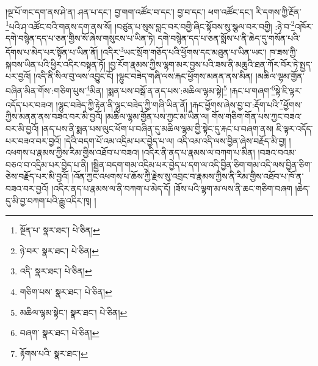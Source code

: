 །ལྔ་པོ་གང་དག་ནས་ཤེ་ན། ཤན་པ་དང་། བྱ་གག་འཚོང་བ་དང་། བྱ་བ་དང་། ཕག་འཚོང་དང་། རི་དགས་ཀྱི་རྔོན་\footnote{སྔོན་པ་  སྣར་ཐང་།  པེ་ཅིན། }པའི་ཤ་འཚོང་བའི་གནས་དག་ནས་སོ། །བཙུན་པ་སུས་བླང་བར་བགྱི་ཞིང་སྟོབས་སུ་སྩལ་བར་བགྱི། :ཉེ་བ་\footnote{ཉེ་བར་  སྣར་ཐང་།  པེ་ཅིན། }འཁོར་དགེ་བསྙེན་དད་པ་ཅན་གྱིས་སོ་ཞེས་གསུངས་པ་ཡིན་ཏེ། དགེ་བསྙེན་དད་པ་ཅན་སྨོས་པ་ནི་ཆེད་དུ་གསོན་པའི་དོགས་པ་མེད་པར་སྟོན་པ་ཡིན་ནོ། །འདིར་\footnote{འདི་  སྣར་ཐང་།  པེ་ཅིན། }ཡང་སྲོག་གཅོད་པའི་ཕྱོགས་དང་མཐུན་པ་ཡིན་ཡང་། ཁ་ཟས་ཀྱི་སྐབས་ཡིན་པའི་ཕྱིར་འདིར་བསྟན་ཏོ། །བྱ་རོག་རྣམས་ཀྱིས་ལྷག་མར་བྱས་པའི་ཟས་ནི་མཆུའི་ཐན་ཀོར་བོར་ཏེ་སྤྱད་པར་བྱའོ། །འདི་ནི་སིལ་བུ་ལས་འབྱུང་ངོ། །ལྷུང་བཟེད་གཞི་ལས་རྐང་ཕྱོགས་མནན་ནས་མིན། །མཆིལ་ལྷམ་གྱོན་བཞིན་མིན་གོས་:གཅིག་པུས་\footnote{གཅིག་པས་  སྣར་ཐང་།  པེ་ཅིན། }མིན། །སྨན་པས་བསྒོ་ན་ནད་པས་:མཆིལ་ལྷམ་སྟེ།\footnote{མཆིལ་ལྷམ་སྟེང་།  སྣར་ཐང་།  པེ་ཅིན། } །རྐང་པ་གཞག་\footnote{བཞག་  སྣར་ཐང་།  པེ་ཅིན། }སྟེ་ཇི་ལྟར་འདོད་པར་བཟའ། །ལྷུང་བཟེད་ཀྱི་རྟེན་ནི་ལྷུང་བཟེད་ཀྱི་གཞི་ཡིན་ནོ། །རྐང་ཕྱོགས་ཞེས་བྱ་བ་:རྡོག་པའི་\footnote{རྟོགས་པའི་  སྣར་ཐང་། }ཕྱོགས་ཀྱིས་མནན་ནས་བཟའ་བར་མི་བྱའོ། །མཆིལ་ལྷམ་གྱོན་པས་ཀྱང་མ་ཡིན་ལ། གོས་གཅིག་གོན་པས་ཀྱང་བཟའ་བར་མི་བྱའོ། །ནད་པས་ནི་སྨན་པས་ལུང་ཕོག་པ་བཞིན་དུ་མཆིལ་ལྷམ་གྱི་སྟེང་དུ་རྐང་པ་བཞག་ནས། ཇི་ལྟར་འདོད་པར་བཟའ་བར་བྱའོ། །དེའི་བདག་པོ་འམ་འདྲིམ་པར་བྱེད་པ་ལ། འདི་འམ་འདི་ལས་བྱིན་ཞེས་བརྗོད་མི་བྱ། །འཕགས་པ་རྣམས་ཀྱིས་རིམ་གྱིས་འཐོབ་པ་བཟའ། །འདིར་ནི་ནད་པ་རྣམས་ལ་བཀག་པ་མིན། །བཟའ་བའམ་བཅའ་བ་འདྲིམ་པར་བྱེད་པ་ནི། །སྦྱིན་བདག་གམ་འདྲིམ་པར་བྱེད་པ་དག་ལ་འདི་བྱིན་ཅིག་གམ་འདི་ལས་བྱིན་ཅིག་ཅེས་བརྗོད་པར་མི་བྱའོ། །འོན་ཀྱང་འཕགས་པ་ཆོས་ཀྱི་རྗེས་སུ་འབྲང་བ་རྣམས་ཀྱིས་ནི་རིམ་གྱིས་འཐོབ་པ་ཁོ་ན་བཟའ་བར་བྱའོ། །འདིར་ནད་པ་རྣམས་ལ་ནི་བཀག་པ་མེད་དོ། །ཟོས་པའི་ལྷག་མ་ལས་ནི་ཆང་གཅིག་བཞག །ཆེད་དུ་མི་བྱ་བཀག་པའི་རྒྱུ་འདིར་ཁྭ། །
